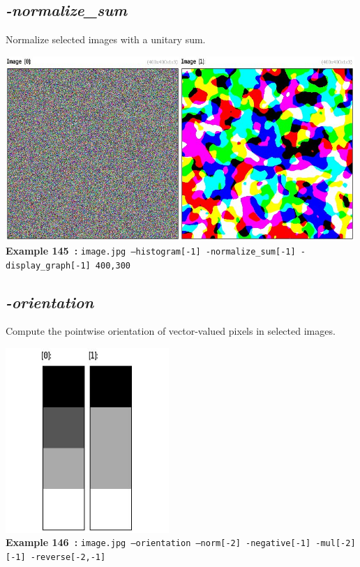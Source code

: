 \documentclass[a4paper,11pt,twoside]{book}
\begin{document}
\subsection{\emph{-normalize\_sum} }\vspace*{-0.5em}
Normalize selected images with a unitary sum.
\begin{center}\includegraphics[keepaspectratio=true,height=7cm,width=\textwidth]{img/gmic_def145.jpg}\\
{\footnotesize \textbf{Example 145~:} \texttt{image.jpg --histogram[-1] -normalize\_sum[-1] -display\_graph[-1] 400,300}}
\end{center}

\subsection{\emph{-orientation} }\vspace*{-0.5em}
Compute the pointwise orientation of vector-valued pixels in selected images.
\begin{center}\includegraphics[keepaspectratio=true,height=7cm,width=\textwidth]{img/gmic_def146.jpg}\\
{\footnotesize \textbf{Example 146~:} \texttt{image.jpg --orientation --norm[-2] -negative[-1] -mul[-2] [-1] -reverse[-2,-1]}}
\end{center}
\end{document}
